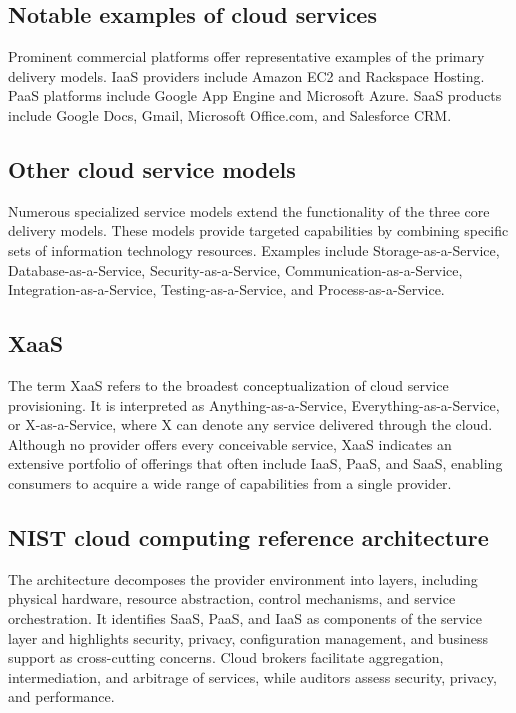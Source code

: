 \documentclass[11pt,a4paper,openany]{report}
\begin{document}
\subsection{Notable examples of cloud services}

Prominent commercial platforms offer representative examples of the primary delivery models. IaaS providers include Amazon EC2 and Rackspace Hosting. PaaS platforms include Google App Engine and Microsoft Azure. SaaS products include Google Docs, Gmail, Microsoft Office.com, and Salesforce CRM.

\subsection{Other cloud service models}

Numerous specialized service models extend the functionality of the three core delivery models. These models provide targeted capabilities by combining specific sets of information technology resources. Examples include Storage-as-a-Service, Database-as-a-Service, Security-as-a-Service, Communication-as-a-Service, Integration-as-a-Service, Testing-as-a-Service, and Process-as-a-Service.

\subsection{XaaS}

The term XaaS refers to the broadest conceptualization of cloud service provisioning. It is interpreted as Anything-as-a-Service, Everything-as-a-Service, or X-as-a-Service, where X can denote any service delivered through the cloud. Although no provider offers every conceivable service, XaaS indicates an extensive portfolio of offerings that often include IaaS, PaaS, and SaaS, enabling consumers to acquire a wide range of capabilities from a single provider.

\subsection{NIST cloud computing reference architecture}

The architecture decomposes the provider environment into layers, including physical hardware, resource abstraction, control mechanisms, and service orchestration. It identifies SaaS, PaaS, and IaaS as components of the service layer and highlights security, privacy, configuration management, and business support as cross-cutting concerns. Cloud brokers facilitate aggregation, intermediation, and arbitrage of services, while auditors assess security, privacy, and performance.
\end{document}
